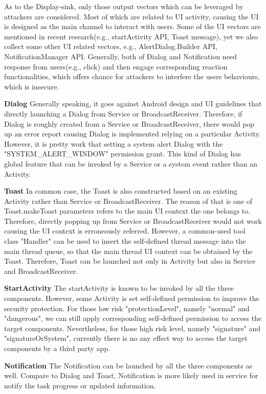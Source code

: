 \documentclass{sig-alternate-05-2015}
\begin{document}
As to the Display-sink, only those output vectors which can be leveraged by attackers are considered. Most of which are related to UI activity, causing the UI is designed as the main channel to interact with users. Some of the UI vectors are mentioned in recent research\cite{bianchi2015app}(e.g., startActivity API, Toast message), yet we also collect some other UI related vectors, e.g., AlertDialog.Builder API, NotificationManager API. Generally, both of Dialog and Notification need response from users(e.g., click) and then engage corresponding reaction functionalities, which offers chance for attackers to interfere the users behaviours, which is insecure.

\textbf{Dialog}
Generally speaking, it goes against Android design and UI guidelines that directly launching a Dialog from Service or BroadcastReceiver. Therefore, if Dialog is roughly created from a Service or BroadcastReceiver, there would pop up an error report causing Dialog is implemented relying on a particular Activity. However, it is pretty work that setting a system alert Dialog with the "SYSTEM\_ALERT\_WINDOW" permission grant. This kind of Dialog has global feature that can be invoked by a Service or a system event rather than an Activity. 

\textbf{Toast}
In common case, the Toast is also constructed based on an existing Activity rather than Service or BroadcastReceiver. The reason of that is one of Toast.makeToast parameters refers to the main UI context the one belongs to. Therefore, directly popping up from Service or BroadcastReceiver would not work causing the UI context is erroneously referred. However, a common-used tool class "Handler" can be used to insert the self-defined thread message into the main thread queue, so that the main thread UI context can be obtained by the Toast. Therefore, Toast can be launched not only in Activity but also in Service and BroadcastReceiver.

\textbf{StartActivity}
The startActivity is known to be invoked by all the three components. However, some Activity is set self-defined permission to improve the security protection. For those low risk "protectionLevel", namely "normal" and "dangerous", we can still apply corresponding self-defined permission to access the target components. Nevertheless, for those high risk level, namely "signature" and "signatureOrSystem", currently there is no any effect way to access the target components by a third party app.

\textbf{Notification}
The Notification can be launched by all the three components as well. Compare to Dialog and Toast, Notification is more likely used in service for notify the task progress or updated information. 
\end{document}
